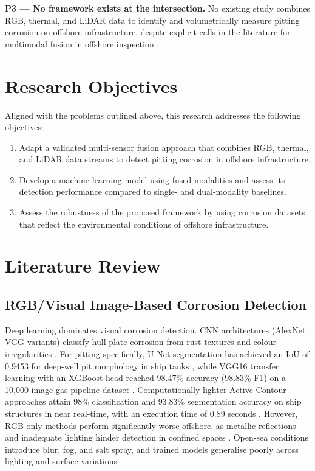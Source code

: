 \documentclass[conference]{IEEEtran}
\begin{document}
\textbf{P3 --- No framework exists at the intersection.} No existing study combines RGB, thermal, and LiDAR data to identify and volumetrically measure pitting corrosion on offshore infrastructure, despite explicit calls in the literature for multimodal fusion in offshore inspection \cite{imran2025ship}.

\section{Research Objectives}

Aligned with the problems outlined above, this research addresses the following objectives:

\begin{enumerate}
    \item \label{ro1} Adapt a validated multi-sensor fusion approach that combines RGB, thermal, and LiDAR data streams to detect pitting corrosion in offshore infrastructure.
    \item \label{ro2} Develop a machine learning model using fused modalities and assess its detection performance compared to single- and dual-modality baselines.
    \item \label{ro3} Assess the robustness of the proposed framework by using corrosion datasets that reflect the environmental conditions of offshore infrastructure.
\end{enumerate}

\section{Literature Review}

\subsection{RGB/Visual Image-Based Corrosion Detection}
Deep learning dominates visual corrosion detection. CNN architectures (AlexNet, VGG variants) classify hull-plate corrosion from rust textures and colour irregularities \cite{yao2019artificial}. For pitting specifically, U-Net segmentation has achieved an IoU of 0.9453 for deep-well pit morphology in ship tanks \cite{soares2023autonomous}, while VGG16 transfer learning with an XGBoost head reached 98.47\% accuracy (98.83\% F1) on a 10{,}000-image gas-pipeline dataset \cite{alvani2026corrosion}. Computationally lighter Active Contour approaches attain 98\% classification and 93.83\% segmentation accuracy on ship structures in near real-time, with an execution time of 0.89 seconds \cite{imran2025ship}. However, RGB-only methods perform significantly worse offshore, as metallic reflections and inadequate lighting hinder detection in confined spaces \cite{soares2023autonomous}. Open-sea conditions introduce blur, fog, and salt spray, and trained models generalise poorly across lighting and surface variations \cite{imran2025ship, yao2019artificial}.
\end{document}
